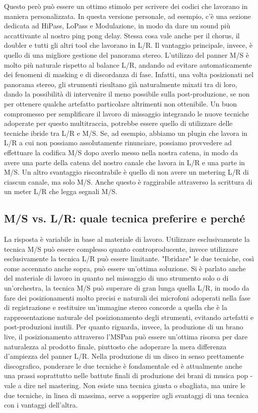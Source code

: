 \documentclass{article}
\begin{document}
    Questo però può essere un ottimo stimolo per scrivere dei codici che lavorano in maniera personalizzata. In questa versione personale, ad esempio, c'è una sezione dedicata ad HiPass, LoPass e Modulazione, in modo da dare un sound più accattivante al nostro ping pong delay.
    Stessa cosa vale anche per il chorus, il doubler e tutti gli altri tool che lavorano in L/R.
    Il vantaggio principale, invece, è quello di una migliore gestione del panorama stereo. L'utilizzo del panner M/S è molto più naturale rispetto al balance L/R, andando ad evitare automaticamente dei fenomeni di masking e di discordanza di fase. Infatti, una volta posizionati nel panorama stereo, gli strumenti risultano già naturalmente mixati tra di loro, dando la possibilità di intervenire il meno possibile sulla post-produzione, se non per ottenere qualche artefatto particolare altrimenti non ottenibile.
    Un buon compromesso per semplificare il lavoro di missaggio integrando le nuove tecniche adoperate per questo multitraccia, potrebbe essere quello di utilizzare delle tecniche ibride tra L/R e M/S. Se, ad esempio, abbiamo un plugin che lavora in L/R a cui non possiamo assolutamente rinunciare, possiamo provvedere ad effettuare la codifica M/S dopo averlo messo nella nostra catena, in modo da avere una parte della catena del nostro canale che lavora in L/R e una parte in M/S.
    Un altro svantaggio riscontrabile è quello di non avere un metering L/R di ciascun canale, ma solo M/S. Anche questo è raggirabile attraverso la scrittura di un meter L/R che legga segnali M/S.

\subsection{M/S vs. L/R: quale tecnica preferire e perché}

    La risposta è variabile in base al materiale di lavoro. Utilizzare esclusivamente la tecnica M/S può essere complesso quanto controproducente, invece utilizzare esclusivamente la tecnica L/R può essere limitante. "Ibridare" le due tecniche, così come accennato anche sopra, può essere un'ottima soluzione.
    Si è parlato anche del materiale di lavoro in quanto nel missaggio di uno strumento solo o di un'orchestra, la tecnica M/S può superare di gran lunga quella L/R, in modo da fare dei posizionamenti molto precisi e naturali dei microfoni adoperati nella fase di registrazione e restituire un'immagine stereo concorde a quella che è la rappresentazione naturale del posizionamento degli strumenti, evitando artefatti e post-produzioni inutili.
    Per quanto riguarda, invece, la produzione di un brano live, il posizionamento attraverso l'MSPan può essere un'ottima risorsa per dare naturalezza al prodotto finale, piuttosto che adoperare la mera differenza d'ampiezza del panner L/R.
    Nella produzione di un disco in senso prettamente discografico, ponderare le due tecniche è fondamentale ed è attualmente anche una prassi soprattutto nelle battute finali di produzione dei brani di musica pop - vale a dire nel mastering.
    Non esiste una tecnica giusta o sbagliata, ma unire le due tecniche, in linea di massima, serve a sopperire agli svantaggi di una tecnica con i vantaggi dell'altra.
\end{document}
